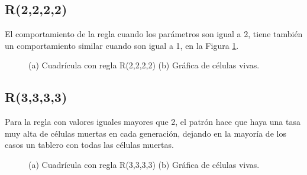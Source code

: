 \subsection{R(2,2,2,2)}
El comportamiento de la regla cuando los parámetros son igual a 2, tiene también un comportamiento similar cuando son igual a 1, en la Figura \ref{fig:R2222}.
\begin{figure}[h]
	\centering
	\caption{(a) Cuadrícula con regla R(2,2,2,2) (b) Gráfica de células vivas.}
	\label{fig:R2222}
\end{figure}
\newpage
\subsection{R(3,3,3,3)}
Para la regla con valores iguales mayores que 2, el patrón hace que haya una tasa muy alta de células muertas en cada generación, dejando en la mayoría de los casos un tablero con todas las células muertas.
\begin{figure}[h]
	\centering
	\caption{(a) Cuadrícula con regla R(3,3,3,3) (b) Gráfica de células vivas.}
	\label{fig:R3333}
\end{figure}
\newpage
